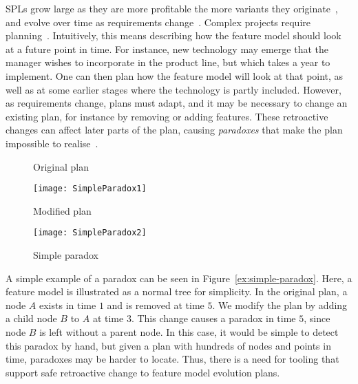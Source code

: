 SPLs grow large as they are more profitable the more variants they originate~\cite{book:introduction-to-spl}, %
and evolve over time as requirements change~\cite{art:context-aware-reconfiguration-in-evolving-software-product-lines, art:darwinspl-an-integrated-tool-suite-for-modeling-evolving-context-aware-software-product-lines}. Complex projects require planning~\cite{art:evofm-feature-driven-planning-of-product-line-evolution}. Intuitively, this means describing how the feature model should look at a future point in time. For instance, new technology may emerge that the manager wishes to incorporate in the product line, but which takes a year to implement. One can then plan how the feature model will look at that point, as well as at some earlier stages where the technology is partly included. However, as requirements change, plans must adapt, and it may be necessary to change an existing plan, for instance by removing or adding features. These retroactive changes can affect later parts of the plan, causing \emph{paradoxes} that make the plan impossible to realise~\cite{art:anomaly-detection-and-explanation-in-context-aware-software-product-lines}. 

\begin{figure}
   \begin{centering}
      \begin{minipage}[t]{0.42\textwidth}
         \vspace{0pt}
         \small
         \begin{center}
            Original plan
         \end{center}
         \texttt{[image: SimpleParadox1]}
      \end{minipage}\hfill
      \begin{minipage}[t]{0.56\textwidth}
         \vspace{0pt}
         \small
          \begin{center}
             Modified plan
          \end{center} 
         \texttt{[image: SimpleParadox2]}
      \end{minipage}
   \end{centering}
   \caption{Simple paradox}
   \label{ex:simple-paradox}
\end{figure}

A simple example of a paradox can be seen in Figure~\vref{ex:simple-paradox}. Here, a feature model is illustrated as a normal tree for simplicity. In the original plan, a node $A$ exists in time $1$ and is removed at time $5$. We modify the plan by adding a child node $B$ to $A$ at time $3$. This change causes a paradox in time $5$, since node $B$ is left without a parent node. In this case, it would be simple to detect this paradox by hand, but given a plan with hundreds of nodes and points in time, paradoxes may be harder to locate.  Thus, there is a need for tooling that support safe retroactive change to feature model evolution plans. 

